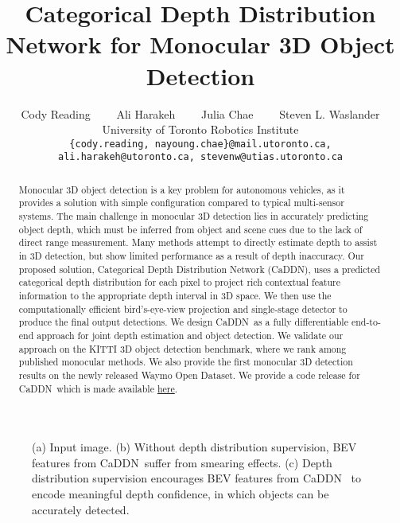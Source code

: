 \documentclass[final]{cvpr}
\newcommand{\method}{CaDDN}
\begin{document}
\title{Categorical Depth Distribution Network for Monocular 3D Object Detection}
\author{
Cody Reading \ \ \ \ Ali Harakeh \ \ \ \ Julia Chae \ \ \ \ Steven L. Waslander\\
University of Toronto Robotics Institute\\
{\tt\small \{cody.reading, nayoung.chae\}@mail.utoronto.ca, ali.harakeh@utoronto.ca, stevenw@utias.utoronto.ca}
}
\maketitle
\begin{abstract}
Monocular 3D object detection is a key problem for autonomous vehicles, as it provides a solution with simple configuration compared to typical multi-sensor systems. The main challenge in monocular 3D detection lies in accurately predicting object depth, which must be inferred from object and scene cues due to the lack of direct range measurement. Many methods attempt to directly estimate depth to assist in 3D detection, but show limited performance as a result of depth inaccuracy. Our proposed solution, Categorical Depth Distribution Network (\method), uses a predicted categorical depth distribution for each pixel to project rich contextual feature information to the appropriate depth interval in 3D space. We then use the computationally efficient bird's-eye-view projection and single-stage detector to produce the final output detections. We design \method~as a fully differentiable end-to-end approach for joint depth estimation and object detection. We validate our approach on the KITTI 3D object detection benchmark,  where we rank  among published monocular methods. We also provide the first monocular 3D detection results on the newly released Waymo Open Dataset. We provide a code release for \method~which is made available \href{https://github.com/TRAILab/CaDDN}{here}.
\end{abstract}
\begin{figure}
\begin{center}

\end{center}
\vspace{-3mm}
 \caption{(a) Input image. (b) Without depth distribution supervision, BEV features from \method~suffer from smearing effects. (c) Depth distribution supervision encourages BEV features from \method~ to encode meaningful depth confidence, in which objects can be accurately detected.}
\label{fig:intro}
\end{figure}
\vspace{-4mm}
\end{document}
